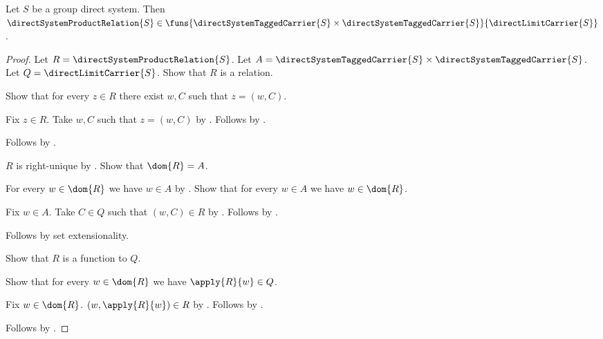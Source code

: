 \begin{theorem}\label{direct_system_product_relation_type}
    Let $S$ be a group direct system.
    Then $\directSystemProductRelation{S}\in
        \funs{
            \directSystemTaggedCarrier{S}\times
            \directSystemTaggedCarrier{S}}
            {\directLimitCarrier{S}}$.
\end{theorem}
\begin{proof}
    Let $R=\directSystemProductRelation{S}$.
    Let $A=\directSystemTaggedCarrier{S}\times
        \directSystemTaggedCarrier{S}$.
    Let $Q=\directLimitCarrier{S}$.
    Show that $R$ is a relation.
    \begin{subproof}
        Show that for every $z\in R$ there exist $w,C$ such that
            $z=(w,C)$.
        \begin{subproof}
            Fix $z\in R$.
            Take $w,C$ such that $z=(w,C)$ by
                .
            Follows by \auto.
        \end{subproof}
        Follows by .
    \end{subproof}
    $R$ is right-unique by
        .
    Show that $\dom{R}=A$.
    \begin{subproof}
        For every $w\in\dom{R}$ we have $w\in A$ by
            .
        Show that for every $w\in A$ we have $w\in\dom{R}$.
        \begin{subproof}
            Fix $w\in A$.
            Take $C\in Q$ such that $(w,C)\in R$ by
                .
            Follows by .
        \end{subproof}
        Follows by set extensionality.
    \end{subproof}
    Show that $R$ is a function to $Q$.
    \begin{subproof}
        Show that for every $w\in\dom{R}$ we have
            $\apply{R}{w}\in Q$.
        \begin{subproof}
            Fix $w\in\dom{R}$.
            $(w,\apply{R}{w})\in R$ by
                .
            Follows by
                .
        \end{subproof}
    \end{subproof}
    Follows by .
\end{proof}

